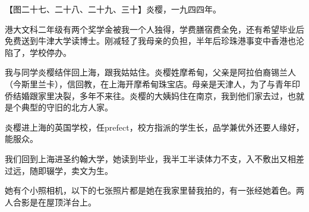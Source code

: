 \clearpage
\par 【图二十七、二十八、二十九、三十】炎樱，一九四四年。
\par 港大文科二年级有两个奖学金被我一个人独得，学费膳宿费全免，还有希望毕业后免费送到牛津大学读博士。刚减轻了我母亲的负担，半年后珍珠港事变中香港也沦陷了，学校停办。
\par 我与同学炎樱结伴回上海，跟我姑姑住。炎樱姓摩希甸，父亲是阿拉伯裔锡兰人（今斯里兰卡），信回教，在上海开摩希甸珠宝店。母亲是天津人，为了与青年印侨结婚跟家里决裂，多年不来往。炎樱的大姨妈住在南京，我到他们家去过，也就是个典型的守旧的北方人家。
\par 炎樱进上海的英国学校，任prefect，校方指派的学生长，品学兼优外还要人缘好，能服众。
\par 我们回到上海进圣约翰大学，她读到毕业，我半工半读体力不支，入不敷出又相差过远，随即辍学，卖文为生。
\par 她有个小照相机，以下的七张照片都是她在我家里替我拍的，有一张经她着色。两人合影是在屋顶洋台上。
